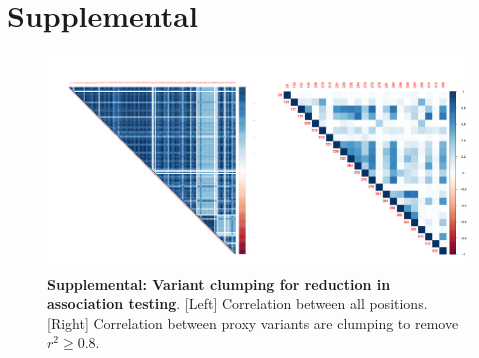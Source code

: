 \documentclass{article} %
\newcommand{\beginsupplement}{%
        \setcounter{table}{0}
        \renewcommand{\thetable}{S\arabic{table}}%
        \setcounter{figure}{0}
        \renewcommand{\thefigure}{S\arabic{figure}}%
     }
\begin{document}




\beginsupplement
\section{Supplemental}
 \label{sec:Supplemental_text}
									
\begin{figure}[ht] \hspace{-0.5cm} 
    \includegraphics[scale=0.85]{S1}
	\caption{\textbf{Supplemental: Variant clumping for reduction in association testing}. [Left] Correlation between all positions. [Right] Correlation between proxy variants are clumping to remove $r^2 \ge 0.8$.}
	\label{fig:S1}
\end{figure}
\end{document}
